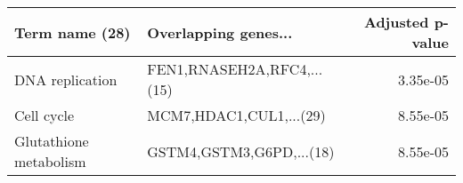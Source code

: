 \begin{tabular}{llr}
\toprule
        Term name (28) &       Overlapping genes... &  Adjusted p-value \\
\midrule
       DNA replication & FEN1,RNASEH2A,RFC4,...(15) &          3.35e-05 \\
            Cell cycle &    MCM7,HDAC1,CUL1,...(29) &          8.55e-05 \\
Glutathione metabolism &   GSTM4,GSTM3,G6PD,...(18) &          8.55e-05 \\
\bottomrule
\end{tabular}
